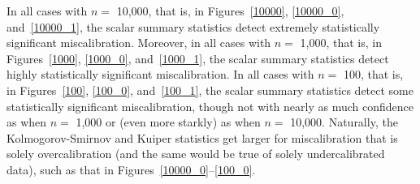\documentclass{article}
\begin{document}
In all cases with $n =$ 10,000, that is, in Figures~\ref{10000}, \ref{10000_0},
and~\ref{10000_1}, the scalar summary statistics detect
extremely statistically significant miscalibration.
Moreover, in all cases with $n =$ 1,000, that is, in Figures~\ref{1000},
\ref{1000_0}, and~\ref{1000_1}, the scalar summary statistics detect
highly statistically significant miscalibration.
In all cases with $n =$ 100, that is, in Figures~\ref{100}, \ref{100_0},
and~\ref{100_1}, the scalar summary statistics detect
some statistically significant miscalibration,
though not with nearly as much confidence as when $n =$ 1,000
or (even more starkly) as when $n =$ 10,000.
Naturally, the Kolmogorov-Smirnov and Kuiper statistics get larger
for miscalibration that is solely overcalibration
(and the same would be true of solely undercalibrated data),
such as that in Figures~\ref{10000_0}--\ref{100_0}.
\end{document}
